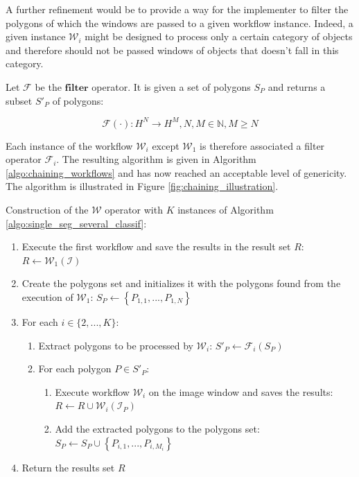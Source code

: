 A further refinement would be to provide a way for the implementer to filter the polygons of which the windows are passed to a given workflow instance. Indeed, a given instance $\mathcal{W}_i$ might be designed to process only a certain category of objects and therefore should not be passed windows of objects that doesn't fall in this category. 

\begin{definition}\label{def:filter_op}
	Let $\mathcal{F}$ be the $\textbf{filter}$ operator. It is given a set of polygons $S_P$ and returns a subset $S'_P$ of polygons:
	
	\begin{equation}
		\mathcal{F}(\cdot): H^N \rightarrow H^M, N, M \in \mathbb{N}, M \geq N
	\end{equation}
\end{definition}

Each instance of the workflow $\mathcal{W}_i$ except $\mathcal{W}_1$ is therefore associated a filter operator $\mathcal{F}_i$. The resulting algorithm is given in Algorithm \ref{algo:chaining_workflows} and has now reached an acceptable level of genericity. The algorithm is illustrated in Figure \ref{fig:chaining_illustration}.

\begin{algorithm} \label{algo:chaining_workflows}
	Construction of the $\mathcal{W}$ operator with $K$ instances of Algorithm \ref{algo:single_seg_several_classif}:

	\begin{enumerate}
		\item Execute the first workflow and save the results in the result set $R$: $R \leftarrow \mathcal{W}_1(\mathcal{I})$
		\item Create the polygons set and initializes it with the polygons found from the execution of $\mathcal{W}_1$: $S_P \leftarrow \left\{P_{1,1}, ..., P_{1,N}\right\}$
		\item For each $i \in \{2, ..., K\}$:
		\begin{enumerate}
			\item Extract polygons to be processed by $\mathcal{W}_i$: $S'_P \leftarrow \mathcal{F}_i(S_P)$
			\item For each polygon $P \in S'_P$:
			\begin{enumerate}
				\item Execute workflow $\mathcal{W}_i$ on the image window and saves the results: $R \leftarrow R \cup \mathcal{W}_i(\mathcal{I}_P)$
				\item Add the extracted polygons to the polygons set: $S_P \leftarrow S_P \cup \left\{P_{i,1}, ..., P_{i,M_i}\right\}$
			\end{enumerate}
		\end{enumerate}
		\item Return the results set $R$
	\end{enumerate}
\end{algorithm}

